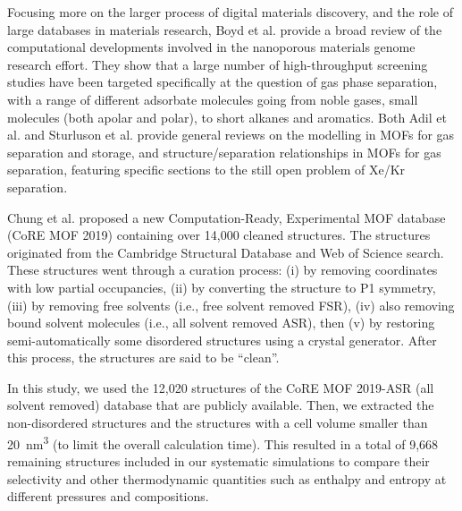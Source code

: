 \documentclass[main.tex]{subfiles}
\begin{document}
Focusing more on the larger process of digital materials discovery, and the role of large databases in materials research,\cite{Zhou_2019} Boyd et al.\cite{Boyd_2017} provide a broad review of the computational developments involved in the nanoporous materials genome research effort. They show that a large number of high-throughput screening studies have been targeted specifically at the question of gas phase separation, with a range of different adsorbate molecules going from noble gases, small molecules (both apolar and polar), to short alkanes and aromatics. Both Adil et al.\cite{Adil_2017} and Sturluson et al.\cite{Sturluson_2019} provide general reviews on the modelling in MOFs for gas separation and storage, and structure/separation relationships in MOFs for gas separation, featuring specific sections to the still open problem of Xe/Kr separation.

Chung et al. proposed a new Computation-Ready, Experimental MOF database (CoRE MOF 2019) containing over 14,000 cleaned structures.\cite{Chung_2019} The structures originated from the Cambridge Structural Database and Web of Science search. These structures went through a curation process: (i) by removing coordinates with low partial occupancies, (ii) by converting the structure to P1 symmetry, (iii) by removing free solvents (i.e., free solvent removed FSR), (iv) also removing bound solvent molecules (i.e., all solvent removed ASR), then (v) by restoring semi-automatically some disordered structures using a crystal generator. After this process, the structures are said to be ``clean''.

In this study, we used the 12,020 structures of the CoRE MOF 2019-ASR (all solvent removed) database that are publicly available. Then, we extracted the non-disordered structures and the structures with a cell volume smaller than \SI{20}{\nano\meter\cubed} (to limit the overall calculation time). This resulted in a total of 9,668 remaining structures included in our systematic simulations to compare their selectivity and other thermodynamic quantities such as enthalpy and entropy at different pressures and compositions.

\end{document}
